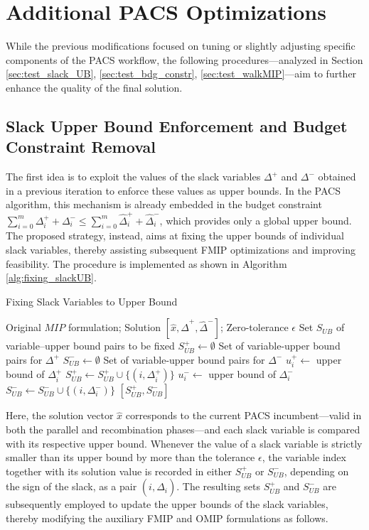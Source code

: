 \section{Additional PACS Optimizations}
While the previous modifications focused on tuning or slightly adjusting specific components of the PACS workflow, the following procedures—analyzed in Section \ref{sec:test_slack_UB}, \ref{sec:test_bdg_constr}, \ref{sec:test_walkMIP}—aim to further enhance the quality of the final solution.

\subsection{Slack Upper Bound Enforcement and Budget Constraint Removal}\label{sec:slack_UB_BDG_constr}
The first idea is to exploit the values of the slack variables $\Delta^+$ and $\Delta^-$ obtained in a previous iteration to enforce these values as upper bounds.  
In the PACS algorithm, this mechanism is already embedded in the budget constraint $\sum_{i=0}^m \Delta_i^{+}+\Delta_i^{-} \le \sum_{i=0}^m \hat\Delta_i^{+}+\hat\Delta_i^{-}$, which provides only a global upper bound. The proposed strategy, instead, aims at fixing the upper bounds of individual slack variables, thereby assisting subsequent FMIP optimizations and improving feasibility.  
The procedure is implemented as shown in Algorithm \ref{alg:fixing_slackUB}.  
\begin{algorithm}[H]
\caption{Fixing Slack Variables to Upper Bound}\label{alg:fixing_slackUB}
\begin{algorithmic}[1]
\Require Original $MIP$ formulation; Solution $[\hat{x}, \hat{\Delta}^+, \hat{\Delta}^-]$; Zero-tolerance $\epsilon$
\Ensure Set $S_{UB}$ of variable–upper bound pairs to be fixed
    \State $S_{UB}^+ \gets \emptyset$ \Comment Set of variable-upper bound pairs for $\Delta^+$
    \State $S_{UB}^- \gets \emptyset$ \Comment Set of variable-upper bound pairs for $\Delta^-$
        \State $u^+_i \gets$ upper bound of $\Delta^+_i$
            \State $S_{UB}^+ \gets S_{UB}^+ \cup \{(i, \Delta^+_i)\}$
        \EndIf
        \State $u^-_i \gets$ upper bound of $\Delta^-_i$
            \State $S_{UB}^- \gets S_{UB}^- \cup \{(i, \Delta^-_i)\}$
        \EndIf
    \EndFor
    \State \Return $[S_{UB}^+, S_{UB}^-]$
\EndFunction
\end{algorithmic}
\end{algorithm}
Here, the solution vector $\hat{x}$ corresponds to the current PACS incumbent---valid in both the parallel and recombination phases---and each slack variable is compared with its respective upper bound. Whenever the value of a slack variable is strictly smaller than its upper bound by more than the tolerance $\epsilon$, the variable index together with its solution value is recorded in either $S_{UB}^+$ or $S_{UB}^-$, depending on the sign of the slack, as a pair $(i, \hat{\Delta}_i)$.
The resulting sets $S_{UB}^+$ and $S_{UB}^-$ are subsequently employed to update the upper bounds of the slack variables, thereby modifying the auxiliary FMIP and OMIP formulations as follows.
